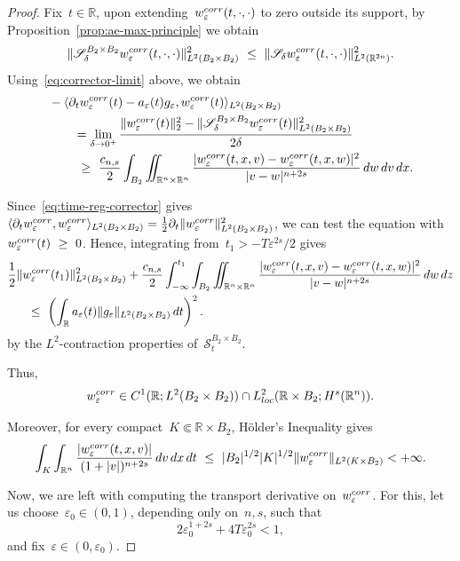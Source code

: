 \documentclass[leqno,10pt]{amsart}
\theoremstyle{plain}
\theoremstyle{remark}
\numberwithin{equation}{section}
\def\dz{\,{\rm d}z}
\def\dx{\,{\rm d}x}
\def\dv{\,{\rm d}v}
\def\dw{\,{\rm d}w}
\def\dt{\,{\rm d}t}
\def\er{\mathbb{R}}
\def\ern{\mathbb{R}^n}
\newcommand{\eps}{\varepsilon}
\begin{document}
{\begin{proof}
Fix~$t\in \er$, upon extending~$w_\eps^{\rm corr}(t,\cdot,\cdot)$ to zero outside its support, by Proposition~\ref{prop:ae-max-principle} we obtain
\[
\|\mathscr{S}_\delta^{B_2\times B_2}w_\eps^{\rm corr}(t,\cdot,\cdot)\|_{L^2(B_2\times B_2)}^2
\ \leq\ \|\mathscr{S}_\delta w_\eps^{\rm corr}(t,\cdot,\cdot)\|_{L^2(\er^{2n})}^2.
\]
Using~\eqref{eq:corrector-limit} above, we obtain
\[
\begin{aligned}
&-\langle\partial_tw_\eps^{\rm corr}(t)-a_\eps(t)g_\eps,
                  w_\eps^{\rm corr}(t)\rangle_{L^2(B_2\times B_2)}
\\
&\qquad=
\lim_{\delta \to 0^+}
\frac{\|w_\eps^{\rm corr}(t)\|_2^2
 -\|\mathscr{S}_\delta^{B_2\times B_2}w_\eps^{\rm corr}(t)\|_{L^2(B_2\times B_2)}^2}{2\delta}
\\
&\qquad\ \geq\ \frac{c_{n,s}}2\int_{B_2} \iint_{\ern\times\ern}
 \frac{|w_\eps^{\rm corr}(t,x,v)-w_\eps^{\rm corr}(t,x,w)|^2}
 {|v-w|^{n+2s}}\dw\dv\dx.
\end{aligned}
\]

Since~\eqref{eq:time-reg-corrector} gives~$\langle\partial_tw_\eps^{\rm corr},w_\eps^{\rm corr}\rangle_{L^2(B_2\times B_2)}
=\frac12\partial_t\|w_\eps^{\rm corr}\|_{L^2(B_2\times B_2)}^2$, we can test the equation with~$w_\eps^{\rm corr}(t)\ \geq\ 0$. Hence, integrating from~$t_1> - T\eps^{2s}/2$ gives
\[
\begin{aligned}
&\frac12\|w_\eps^{\rm corr}(t_1)\|_{L^2(B_2\times B_2)}^2
+\frac{c_{n,s}}2
 \int_{-\infty}^{t_1}\int_{B_2}
 \iint_{\ern\times\ern}
 \frac{|w_\eps^{\rm corr}(t,x,v)-w_\eps^{\rm corr}(t,x,w)|^2}
 {|v-w|^{n+2s}}\dw\dz
\\
&\quad\ \ \leq\ \left(\int_{\er}a_\eps(t)\|g_\eps\|_{L^2(B_2\times B_2)}\dt\right)^2.
\end{aligned}
\]
by the $L^2$-contraction properties of~$\mathscr{S}^{B_2\times B_2}_t$. 

Thus,
\[
w_\eps^{\rm corr}\in
 C^1(\er;L^2(B_2\times B_2)) \cap L^2_{\rm loc}(\er\times B_2;H^s(\ern)).
\]

Moreover, for every compact~$K\Subset\mathbb{R}\times B_2$, H\"older's Inequality gives
\[
\int_K\int_{\ern}
\frac{|w_\eps^{\rm corr}(t,x,v)|}{(1+|v|)^{n+2s}}\dv\dx\dt
\  \leq\ |B_2|^{1/2}|K|^{1/2}
\|w_\eps^{\rm corr}\|_{L^2(K\times B_2)}<+\infty.
\]

Now, we are left with computing the transport derivative on~$w_\eps^{\rm corr}$. For this, let us choose~$\eps_0\in(0,1)$, depending only on~$n,s$, such that
\begin{equation}\label{eq:corr-eps-condition}
2\eps_0^{1+2s}+4T\eps_0^{2s}<1,
\end{equation}
and fix~$\eps \in (0,\eps_0)$.


\end{proof}}
\end{document}
